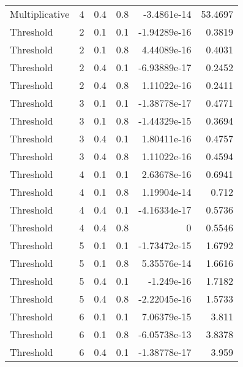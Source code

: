 \documentclass{article}
\begin{document}
\begin{longtable}[H]{lrrrrr}
 Multiplicative &       4 &   0.4 &            0.8 &     -3.4861e-14  &         53.4697 \\
 Threshold      &       2 &   0.1 &            0.1 &     -1.94289e-16 &          0.3819 \\
 Threshold      &       2 &   0.1 &            0.8 &      4.44089e-16 &          0.4031 \\
 Threshold      &       2 &   0.4 &            0.1 &     -6.93889e-17 &          0.2452 \\
 Threshold      &       2 &   0.4 &            0.8 &      1.11022e-16 &          0.2411 \\
 Threshold      &       3 &   0.1 &            0.1 &     -1.38778e-17 &          0.4771 \\
 Threshold      &       3 &   0.1 &            0.8 &     -1.44329e-15 &          0.3694 \\
 Threshold      &       3 &   0.4 &            0.1 &      1.80411e-16 &          0.4757 \\
 Threshold      &       3 &   0.4 &            0.8 &      1.11022e-16 &          0.4594 \\
 Threshold      &       4 &   0.1 &            0.1 &      2.63678e-16 &          0.6941 \\
 Threshold      &       4 &   0.1 &            0.8 &      1.19904e-14 &          0.712  \\
 Threshold      &       4 &   0.4 &            0.1 &     -4.16334e-17 &          0.5736 \\
 Threshold      &       4 &   0.4 &            0.8 &      0           &          0.5546 \\
 Threshold      &       5 &   0.1 &            0.1 &     -1.73472e-15 &          1.6792 \\
 Threshold      &       5 &   0.1 &            0.8 &      5.35576e-14 &          1.6616 \\
 Threshold      &       5 &   0.4 &            0.1 &     -1.249e-16   &          1.7182 \\
 Threshold      &       5 &   0.4 &            0.8 &     -2.22045e-16 &          1.5733 \\
 Threshold      &       6 &   0.1 &            0.1 &      7.06379e-15 &          3.811  \\
 Threshold      &       6 &   0.1 &            0.8 &     -6.05738e-13 &          3.8378 \\
 Threshold      &       6 &   0.4 &            0.1 &     -1.38778e-17 &          3.959  \\

\end{longtable}
\end{document}
